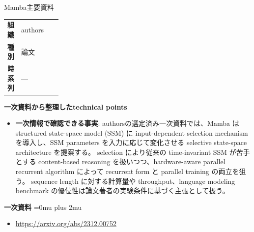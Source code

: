 \begin{technicalnote}{Mamba}{主要資料}
\begingroup
\begin{tabularx}{\linewidth}{@{}>{\bfseries}p{0.22\linewidth}X@{}}
組織 & authors \\
種別 & 論文 \\
時系列 & — \\
\end{tabularx}
\smallskip
{\bfseries 一次資料から整理したtechnical points}
\begin{itemize}[leftmargin=1.5em,itemsep=0.35em]
\item \textbf{一次情報で確認できる事実}: authorsの選定済み一次資料では、Mamba は structured state-space model (SSM) に input-dependent selection mechanism を導入し、SSM parameters を入力に応じて変化させる selective state-space architecture を提案する。 selection により従来の time-invariant SSM が苦手とする content-based reasoning を扱いつつ、hardware-aware parallel recurrent algorithm によって recurrent form と parallel training の両立を狙う。 sequence length に対する計算量や throughput、language modeling benchmark の優位性は論文著者の実験条件に基づく主張として扱う。
\end{itemize}
\begin{minipage}{\linewidth}
\begin{samepage}
{\bfseries 一次資料}
\begingroup\sloppy
\Urlmuskip=0mu plus 2mu\relax
\begin{itemize}[leftmargin=1.5em,itemsep=0.25em]
\item {\scriptsize\url{https://arxiv.org/abs/2312.00752}}
\end{itemize}
\endgroup
\end{samepage}
\end{minipage}
\endgroup
\end{technicalnote}
\medskip
